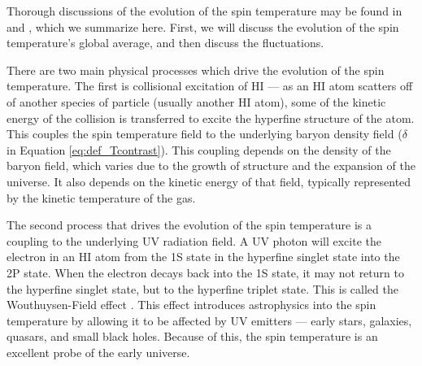 Thorough discussions of the evolution of the spin temperature may be found in \citet{FOB} and
\citet{Pritchard2012}, which we summarize here. First, we will discuss the evolution of the spin
temperature's global average, and then discuss the fluctuations.

There are two main physical processes which drive the evolution of the spin temperature. The first
is collisional excitation of HI --- as an HI atom scatters off of another species of particle
(usually another HI atom), some of the kinetic energy of the collision is transferred to excite the
hyperfine structure of the atom. This couples the spin temperature field to the underlying baryon
density field ($\delta$ in Equation \ref{eq:def_Tcontrast}). This coupling depends on the
density of the baryon field, which varies due to the growth of structure and the expansion of the
universe. It also depends on the kinetic energy of that field, typically represented by the kinetic
temperature of the gas.

The second process that drives the evolution of the spin temperature is a coupling to the underlying
UV radiation field. A UV photon will excite the electron in an HI atom from the 1S state in the
hyperfine singlet state into the 2P state. When the electron decays back into the 1S state, it
may not return to the hyperfine singlet state, but to the hyperfine triplet state. This is called
the Wouthuysen-Field effect \cite{Wouthuysen1952, Field1958}. This effect introduces astrophysics
into the spin temperature by allowing it to be affected by UV emitters --- early stars, galaxies,
quasars, and small black holes. Because of this, the spin temperature is an excellent probe of the
early universe. 

